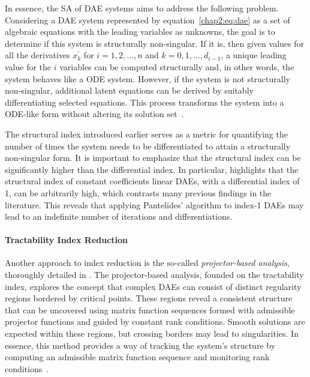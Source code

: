 In essence, the \ac{SA} of \ac{DAE} systems aims to address the following problem. Considering a \ac{DAE} system represented by equation~\eqref{chap2:eq:dae} as a set of algebraic equations with the leading variables as unknowns, the goal is to determine if this system is structurally non-singular. If it is, then given values for all the derivatives $x_k^{\prime}$ for $i = 1, 2, \dots, n$ and $k = 0, 1, \dots, d_{i-1}$, a unique leading value for the $i$ variables can be computed structurally and, in other words, the system behaves like a \ac{ODE} system. However, if the system is not structurally non-singular, additional latent equations can be derived by suitably differentiating selected equations. This process transforms the system into a \ac{ODE}-like form without altering its solution set~\cite{benveniste2021structural}.

The structural index introduced earlier serves as a metric for quantifying the number of times the system needs to be differentiated to attain a structurally non-singular form. It is important to emphasize that the structural index can be significantly higher than the differential index. In particular, \citet{reissig2000differential} highlights that the structural index of constant coefficients linear \acp{DAE}, with a differential index of 1, can be arbitrarily high, which contrasts many previous findings in the literature. This reveals that applying Pantelides' algorithm to index-1 \acp{DAE} may lead to an indefinite number of iterations and differentiations.

\paragraph{Tractability Index Reduction}

Another approach to index reduction is the so-called \emph{projector-based analysis}, thoroughly detailed in \citet{lamour2013differential, marz2014differential}. The projector-based analysis, founded on the tractability index, explores the concept that complex \acp{DAE} can consist of distinct regularity regions bordered by critical points. These regions reveal a consistent structure that can be uncovered using matrix function sequences formed with admissible projector functions and guided by constant rank conditions. Smooth solutions are expected within these regions, but crossing borders may lead to singularities. In essence, this method provides a way of tracking the system's structure by computing an admissible matrix function sequence and monitoring rank conditions~\cite{lamour2011computational}.

